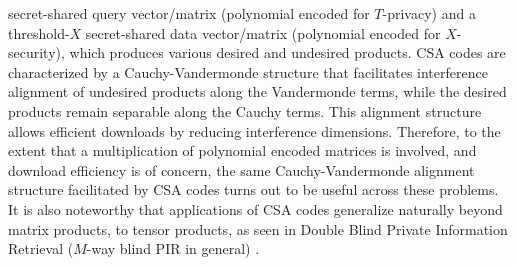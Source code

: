 secret-shared query vector/matrix (polynomial encoded for $T$-privacy) and a threshold-$X$ secret-shared data vector/matrix (polynomial encoded for $X$-security), which produces various desired and undesired products. CSA codes are characterized by a Cauchy-Vandermonde structure that facilitates interference alignment of undesired products along the Vandermonde terms, while the desired products remain separable along the Cauchy terms. This alignment structure allows efficient downloads by reducing interference dimensions. Therefore, to the extent that a multiplication of polynomial encoded matrices is involved, and download efficiency is of concern, the same Cauchy-Vandermonde alignment structure facilitated by CSA codes turns out to be useful across these problems. It is also noteworthy that applications of CSA codes generalize naturally beyond matrix products, to tensor products, as seen in Double Blind Private Information Retrieval ($M$-way blind PIR in general) \cite{Lu_Jia_Jafar_DBTPIR}. 